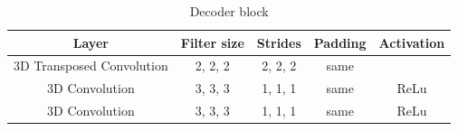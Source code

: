 
\begin{table}[]
\centering
\begin{tabular}{@{}ccccc@{}}
\toprule
Layer                     & Filter size & Strides & Padding & Activation \\ \midrule
3D Transposed Convolution & 2, 2, 2     & 2, 2, 2 & same    &            \\
3D Convolution            & 3, 3, 3     & 1, 1, 1 & same    & ReLu       \\
3D Convolution            & 3, 3, 3     & 1, 1, 1 & same    & ReLu       \\ \bottomrule
\end{tabular}
\caption{Decoder block}
\label{tab:decoder-block}
\end{table}




